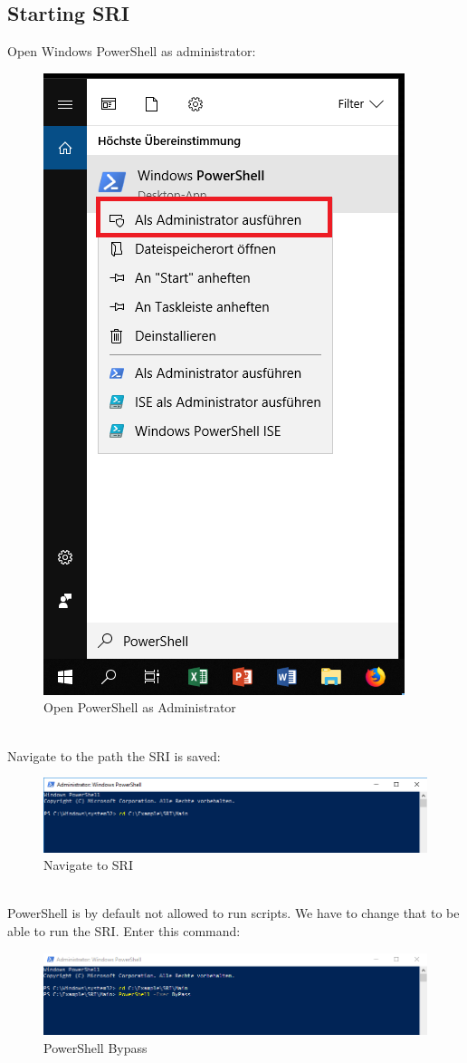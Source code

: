 
\thispagestyle{plain}
\renewcommand\section{\stdsection}
\setcounter{section}{4}
\subsection{Starting SRI}
Open Windows PowerShell as administrator:

\begin{figure}[H]
    \centering
    \includegraphics[width=0.35\linewidth]{assets/ps_admin.png}
    \caption{Open PowerShell as Administrator}
\end{figure} \ \\
Navigate to the path the SRI is saved:
\begin{figure}[H]
    \centering
    \includegraphics[width=1\linewidth]{assets/open_sri.png}
    \caption{Navigate to SRI}
\end{figure} \ \\
PowerShell is by default not allowed to run scripts. We have to change that to be able to run the SRI. Enter this command:
\begin{figure}[H]
    \centering
    \includegraphics[width=1\linewidth]{assets/ps_bypass.png}
    \caption{PowerShell Bypass}
\end{figure} \ \\
